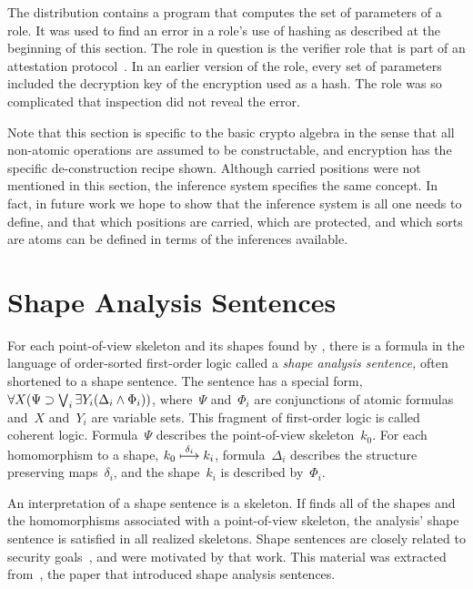 \documentclass[12pt]{report}
\theoremstyle{definition}
\begin{document}
The {\cpsa} distribution contains a program that computes the set of
parameters of a role.  It was used to find an error in a role's use of
hashing as described at the beginning of this section.  The role in
question is the verifier role that is part of an attestation
protocol~\cite{CokerEtAl11}.  In an earlier version of the role,
every set of parameters included the decryption key of the encryption
used as a hash.  The role was so complicated that inspection did not
reveal the error.

Note that this section is specific to the basic crypto algebra in the
sense that all non-atomic operations are assumed to be constructable,
and encryption has the specific de-construction recipe shown.  Although
carried positions were not mentioned in this section, the inference system
specifies the same concept.  In fact, in future work we hope to show that
the inference system is all one needs to define, and that which positions
are carried, which are protected, and which sorts are atoms can be defined
in terms of the inferences available.

\chapter{Shape Analysis Sentences}\label{chp:logic}

For each point-of-view skeleton and its shapes found by {\cpsa}, there
is a formula in the language of order-sorted first-order logic called
a \emph{shape analysis sentence,} often
shortened to a shape sentence.  The sentence has a
special form,
$\mathop{\forall X}(\Psi\supset\bigvee_i\mathop{\exists Y_i}(\Delta_i\wedge\Phi_i))$,
where~$\Psi$ and~$\Phi_i$ are conjunctions of atomic formulas and~$X$
and~$Y_i$ are variable sets.  This fragment of first-order logic is
called coherent logic.  Formula~$\Psi$ describes the point-of-view
skeleton~$k_0$.  For each homomorphism to a shape,
$k_0\stackrel{\delta_i}{\longmapsto}k_i$, formula~$\Delta_i$ describes the
structure preserving maps~$\delta_i$, and the shape~$k_i$ is described
by~$\Phi_i$.

An interpretation of a shape sentence is a skeleton.  If {\cpsa} finds
all of the shapes and the homomorphisms associated with a
point-of-view skeleton, the analysis' shape sentence is satisfied in
all realized skeletons.  Shape sentences are closely related to
security goals~\cite{guttman09}, and were motivated by that work.
This material was extracted from~\cite{ramsdell12}, the paper that
introduced shape analysis sentences.
\end{document}
